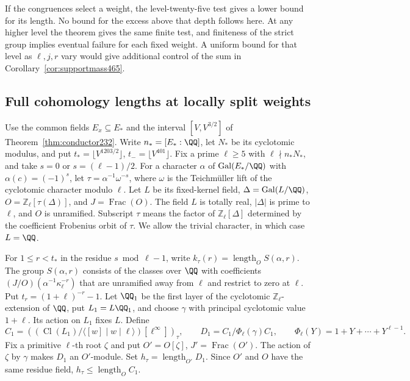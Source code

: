 \documentclass[a4paper,11pt]{article}
\theoremstyle{definition}
\theoremstyle{remark}
\newcommand{\ZZ}{\mathbb Z}\newcommand{\ord}{\operatorname{ord}}
\numberwithin{equation}{section}
\newcommand{\Cl}{\operatorname{Cl}}
\begin{document}
If the congruences select a weight, the level-twenty-five test
gives a lower bound for its length. No bound for the excess above
that depth follows here. At any higher level the theorem gives
the same finite test, and finiteness of the strict group implies
eventual failure for each fixed weight. A uniform bound for that
level as \(\ell,j,r\) vary would give additional control of the
sum in Corollary~\ref{cor:supportmass465}.



\subsection{Full cohomology lengths at locally split weights}
\label{sec:locallysplit502}

Use the common fields \(E_x\subseteq E_*\) and the interval
\([V,V^{3/2}]\) of Theorem~\ref{thm:conductor232}. Write
\(n_*=[E_*:\QQ]\), let \(N_*\) be its cyclotomic modulus, and
put \(t_*=\lfloor V^{1203/2}\rfloor\), \(t_-=\lfloor V^{401}\rfloor\).
Fix a prime \(\ell\ge5\) with \(\ell\nmid n_*N_*\), and take
\(s=0\) or \(s=(\ell-1)/2\). For a character \(\alpha\) of
\(\operatorname{Gal}(E_*/\QQ)\) with \(\alpha(c)=(-1)^s\), let
\(\tau=\alpha^{-1}\omega^{-s}\), where \(\omega\) is the
Teichm\"uller lift of the cyclotomic character modulo \(\ell\).
Let \(L\) be its fixed-kernel field, \(\Delta=\operatorname{Gal}(L/\QQ)\),
\(O=\ZZ_\ell[\tau(\Delta)]\), and \(J=\operatorname{Frac}(O)\).
The field \(L\) is totally real, \(|\Delta|\) is prime to \(\ell\),
and \(O\) is unramified. Subscript \(\tau\) means the factor of
\(\ZZ_\ell[\Delta]\) determined by the coefficient Frobenius orbit
of \(\tau\). We allow the trivial character, in which case \(L=\QQ\).

For \(1\le r<t_*\) in the residue \(s\bmod{\ell-1}\), write
\(k_\tau(r)=\operatorname{length}_O S(\alpha,r)\). The group
\(S(\alpha,r)\) consists of the classes over \(\QQ\) with
coefficients \((J/O)(\alpha^{-1}\kappa_\ell^{-r})\) that are
unramified away from \(\ell\) and restrict to zero at \(\ell\).
Put \(t_r=(1+\ell)^{-r}-1\). Let \(\QQ_1\) be the first layer of
the cyclotomic \(\ZZ_\ell\)-extension of \(\QQ\), put \(L_1=L\QQ_1\),
and choose \(\gamma\) with principal cyclotomic value \(1+\ell\).
Its action on \(L_1\) fixes \(L\). Define
\[
 C_1=\left((\Cl(L_1)/\langle[w]\mid w\mid\ell\rangle)
                    [\ell^\infty]\right)_\tau,\qquad
 D_1=C_1/\Phi_\ell(\gamma)C_1,\qquad
 \Phi_\ell(Y)=1+Y+\cdots+Y^{\ell-1}.
\]
Fix a primitive \(\ell\)-th root \(\zeta\) and put
\(O'=O[\zeta]\), \(J'=\operatorname{Frac}(O')\). The action of
\(\zeta\) by \(\gamma\) makes \(D_1\) an \(O'\)-module. Set
\(h_\tau=\operatorname{length}_{O'}D_1\). Since \(O'\) and \(O\)
have the same residue field, \(h_\tau\le\operatorname{length}_O C_1\).
\end{document}
